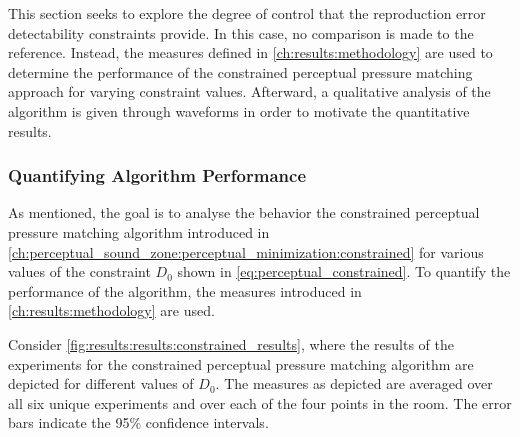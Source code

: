 This section seeks to explore the degree of control that the reproduction error detectability constraints provide.
In this case, no comparison is made to the reference.
Instead, the measures defined in \autoref{ch:results:methodology} are used to determine the performance of the constrained perceptual pressure matching approach for varying constraint values.
Afterward, a qualitative analysis of the algorithm is given through waveforms in order to motivate the quantitative results.

\subsubsection*{Quantifying Algorithm Performance}

As mentioned, the goal is to analyse the behavior the constrained perceptual pressure matching algorithm
introduced in \autoref{ch:perceptual_sound_zone:perceptual_minimization:constrained} for various values of the 
constraint $D_0$ shown in \autoref{eq:perceptual_constrained}. 
To quantify the performance of the algorithm, the measures introduced in \autoref{ch:results:methodology} are used.

Consider \autoref{fig:results:results:constrained_results}, where the results of the experiments for the constrained perceptual pressure matching algorithm are depicted for different values of $D_0$. 
The measures as depicted are averaged over all six unique experiments and over each of the four points in the room. 
The error bars indicate the 95\% confidence intervals.

